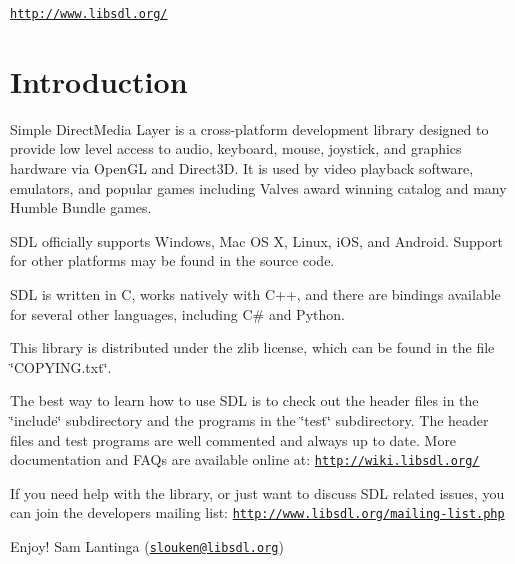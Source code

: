 \href{http://www.libsdl.org/}{\tt http\+://www.\+libsdl.\+org/}\hypertarget{index_intro_sec}{}\section{Introduction}\label{index_intro_sec}
Simple Direct\+Media Layer is a cross-\/platform development library designed to provide low level access to audio, keyboard, mouse, joystick, and graphics hardware via Open\+G\+L and Direct3\+D. It is used by video playback software, emulators, and popular games including Valve\textquotesingle{}s award winning catalog and many Humble Bundle games.

S\+D\+L officially supports Windows, Mac O\+S X, Linux, i\+O\+S, and Android. Support for other platforms may be found in the source code.

S\+D\+L is written in C, works natively with C++, and there are bindings available for several other languages, including C\# and Python.

This library is distributed under the zlib license, which can be found in the file \char`\"{}\+C\+O\+P\+Y\+I\+N\+G.\+txt\char`\"{}.

The best way to learn how to use S\+D\+L is to check out the header files in the \char`\"{}include\char`\"{} subdirectory and the programs in the \char`\"{}test\char`\"{} subdirectory. The header files and test programs are well commented and always up to date. More documentation and F\+A\+Qs are available online at\+: \href{http://wiki.libsdl.org/}{\tt http\+://wiki.\+libsdl.\+org/}

If you need help with the library, or just want to discuss S\+D\+L related issues, you can join the developers mailing list\+: \href{http://www.libsdl.org/mailing-list.php}{\tt http\+://www.\+libsdl.\+org/mailing-\/list.\+php}

Enjoy! Sam Lantinga (\href{mailto:slouken@libsdl.org}{\tt slouken@libsdl.\+org}) 
